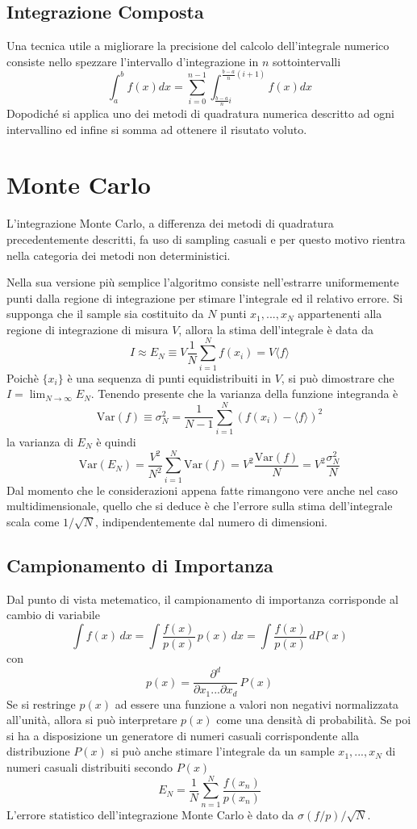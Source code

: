 \subsection{Integrazione Composta}
Una tecnica utile a migliorare la precisione del calcolo dell'integrale numerico consiste nello spezzare l'intervallo d'integrazione in $n$ sottointervalli
$$\int_a^b f(x)dx=\sum_{i=0}^{n-1}\int_{\frac{b-a}{n}i}^{\frac{b-a}{n}(i+1)}f(x)dx$$
Dopodiché si applica uno dei metodi di quadratura numerica descritto ad ogni intervallino ed infine si somma ad ottenere il risutato voluto.

\section{Monte Carlo}
L'integrazione Monte Carlo, a differenza dei metodi di quadratura precedentemente descritti, fa uso di sampling casuali e per questo motivo rientra nella categoria dei metodi non deterministici.

Nella sua versione più semplice l'algoritmo consiste nell'estrarre uniformemente punti dalla regione di integrazione per stimare l'integrale ed il relativo errore. Si supponga che il sample sia costituito da $N$ punti $x_1,...,x_N$ appartenenti alla regione di integrazione di misura $V$, allora la stima dell'integrale è data da
$$ I \approx E_N \equiv V\frac{1}{N} \sum_{i=1}^N f(x_i) = V \langle f \rangle $$
Poichè $\{x_i\}$ è una sequenza di punti equidistribuiti in $V$, si può dimostrare che $ I = \lim_{N \to \infty} E_N $.
Tenendo presente che la varianza della funzione integranda è
$$ \mathrm{Var}(f)\equiv\sigma_N^2 = \frac{1}{N-1} \sum_{i=1}^N (f(x_i) - \langle f \rangle)^2$$
la varianza di $E_N$ è quindi
$$ \mathrm{Var}(E_N) =  \frac{V^2}{N^2} \sum_{i=1}^N \mathrm{Var}(f)  =V^2 \frac{\mathrm{Var}(f)}{N} = V^2\frac{\sigma_N^2}{N}$$
Dal momento che le considerazioni appena fatte rimangono vere anche nel caso multidimensionale, quello che si deduce è che l'errore sulla stima dell'integrale scala come $1/\sqrt{N}$, indipendentemente dal numero di dimensioni.

\subsection{Campionamento di Importanza}
Dal punto di vista metematico, il campionamento di importanza corrisponde al cambio di variabile
$$\int f(x) \,dx = \int\frac{f(x)}{p(x)}\,p(x)\,dx = \int\frac{f(x)}{p(x)}\,dP(x)$$
con $$p(x)=\frac{\partial^d}{\partial x_1...\partial x_d}\,P(x)$$
Se si restringe $p(x)$ ad essere una funzione a valori non negativi normalizzata all'unità, allora si può interpretare $p(x)$ come una densità di probabilità. Se poi si ha a disposizione un generatore di numeri casuali corrispondente alla distribuzione $P(x)$ si può anche stimare l'integrale da un sample $x_1,...,x_N$ di numeri casuali distribuiti secondo $P(x)$
$$E_N = \frac{1}{N}\sum_{n=1}^N\frac{f(x_n)}{p(x_n)}$$
L'errore statistico dell'integrazione Monte Carlo è dato da $\sigma(f/p)/\sqrt N$.

